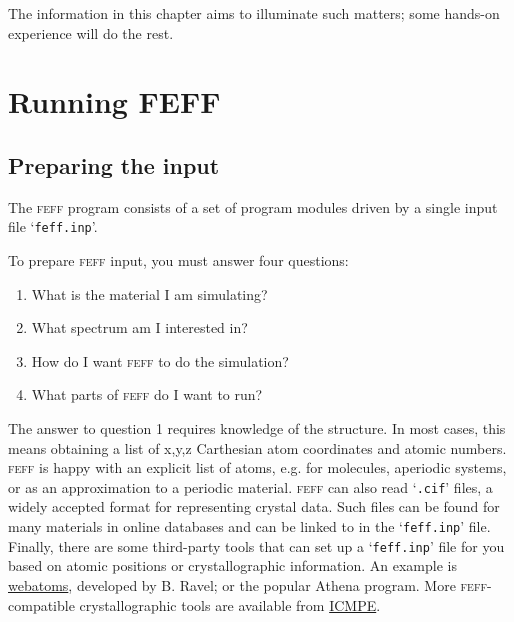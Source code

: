 \documentclass[11pt,oneside]{report} %
\renewcommand{\htmladdnormallink}[2]{\href{#2}{#1}}
\newcommand{\program}[1]{\textsc{#1}}
\newcommand{\feff}{\program{feff}}
\newcommand{\file}[1]{`\texttt{#1}'}
\begin{document}
The information in this chapter aims to illuminate such matters; some hands-on experience will do the rest.


\section{Running FEFF}

\subsection{Preparing the input}
The {\feff} program consists of a set of program modules driven by a single input file \file{feff.inp}.  

To prepare {\feff} input, you must answer four questions:
\begin{enumerate}

\item What is the material I am simulating?
\item What spectrum am I interested in?
\item How do I want {\feff} to do the simulation?
\item What parts of {\feff} do I want to run?
\end{enumerate}

The answer to question 1 requires knowledge of the structure.  In most cases, this means obtaining a list of x,y,z Carthesian atom coordinates and atomic numbers.  {\feff} is happy with an explicit list of atoms, e.g. for molecules, aperiodic systems, or as an approximation to a periodic material.  {\feff} can also read \file{.cif} files, a widely accepted format for representing crystal data.  Such files can be found for many materials in online databases and 
can be linked to in the \file{feff.inp} file.  Finally, there are some third-party tools that can set up a \file{feff.inp} file for you based on atomic positions or crystallographic information.  An example is \htmladdnormallink
{webatoms}{http://cars9.uchicago.edu/~ravel/software/aboutatoms.html}, developed by B. Ravel; or the popular Athena program.    More {\feff}-compatible crystallographic tools are available from \htmladdnormallink{ICMPE}{http://www.icmpe.cnrs.fr/spip.php?article578&lang=fr}.
\end{document}
